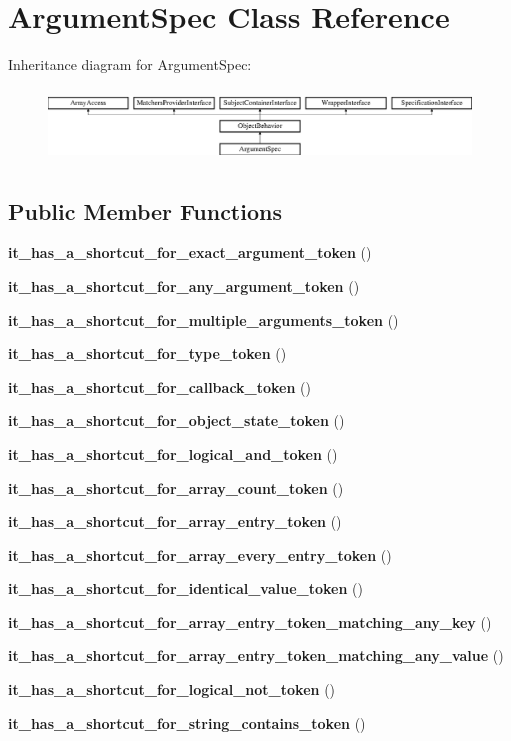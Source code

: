 \section{Argument\+Spec Class Reference}
\label{classspec_1_1_prophecy_1_1_argument_spec}
Inheritance diagram for Argument\+Spec\+:\begin{figure}[H]
\begin{center}
\leavevmode
\includegraphics[height=1.953488cm]{classspec_1_1_prophecy_1_1_argument_spec}
\end{center}
\end{figure}
\subsection*{Public Member Functions}
\begin{DoxyCompactItemize}
\item 
{\bf it\+\_\+has\+\_\+a\+\_\+shortcut\+\_\+for\+\_\+exact\+\_\+argument\+\_\+token} ()
\item 
{\bf it\+\_\+has\+\_\+a\+\_\+shortcut\+\_\+for\+\_\+any\+\_\+argument\+\_\+token} ()
\item 
{\bf it\+\_\+has\+\_\+a\+\_\+shortcut\+\_\+for\+\_\+multiple\+\_\+arguments\+\_\+token} ()
\item 
{\bf it\+\_\+has\+\_\+a\+\_\+shortcut\+\_\+for\+\_\+type\+\_\+token} ()
\item 
{\bf it\+\_\+has\+\_\+a\+\_\+shortcut\+\_\+for\+\_\+callback\+\_\+token} ()
\item 
{\bf it\+\_\+has\+\_\+a\+\_\+shortcut\+\_\+for\+\_\+object\+\_\+state\+\_\+token} ()
\item 
{\bf it\+\_\+has\+\_\+a\+\_\+shortcut\+\_\+for\+\_\+logical\+\_\+and\+\_\+token} ()
\item 
{\bf it\+\_\+has\+\_\+a\+\_\+shortcut\+\_\+for\+\_\+array\+\_\+count\+\_\+token} ()
\item 
{\bf it\+\_\+has\+\_\+a\+\_\+shortcut\+\_\+for\+\_\+array\+\_\+entry\+\_\+token} ()
\item 
{\bf it\+\_\+has\+\_\+a\+\_\+shortcut\+\_\+for\+\_\+array\+\_\+every\+\_\+entry\+\_\+token} ()
\item 
{\bf it\+\_\+has\+\_\+a\+\_\+shortcut\+\_\+for\+\_\+identical\+\_\+value\+\_\+token} ()
\item 
{\bf it\+\_\+has\+\_\+a\+\_\+shortcut\+\_\+for\+\_\+array\+\_\+entry\+\_\+token\+\_\+matching\+\_\+any\+\_\+key} ()
\item 
{\bf it\+\_\+has\+\_\+a\+\_\+shortcut\+\_\+for\+\_\+array\+\_\+entry\+\_\+token\+\_\+matching\+\_\+any\+\_\+value} ()
\item 
{\bf it\+\_\+has\+\_\+a\+\_\+shortcut\+\_\+for\+\_\+logical\+\_\+not\+\_\+token} ()
\item 
{\bf it\+\_\+has\+\_\+a\+\_\+shortcut\+\_\+for\+\_\+string\+\_\+contains\+\_\+token} ()
\end{DoxyCompactItemize}
